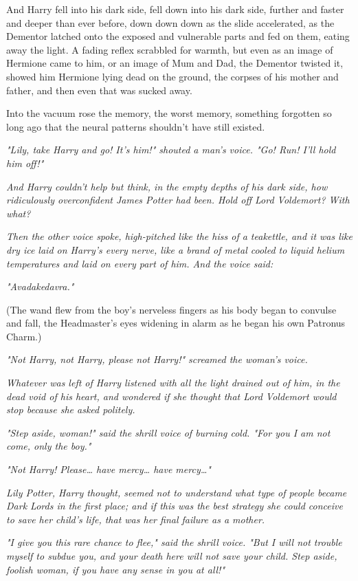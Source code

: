 And Harry fell into his dark side, fell down into his dark side, further and 
faster and deeper than ever before, down down down as the slide accelerated, as 
the Dementor latched onto the exposed and vulnerable parts and fed on them, 
eating away the light. A fading reflex scrabbled for warmth, but even as an 
image of Hermione came to him, or an image of Mum and Dad, the Dementor twisted 
it, showed him Hermione lying dead on the ground, the corpses of his mother and 
father, and then even that was sucked away.

Into the vacuum rose the memory, the worst memory, something forgotten so long 
ago that the neural patterns shouldn't have still existed.

\emph{"Lily, take Harry and go! It's him!" shouted a man's voice. "Go! Run! 
I'll hold him off!"}

\emph{And Harry couldn't help but think, in the empty depths of his dark side, 
how ridiculously overconfident James Potter had been. Hold off Lord Voldemort? 
With what?}

\emph{Then the other voice spoke, high-pitched like the hiss of a teakettle, 
and it was like dry ice laid on Harry's every nerve, like a brand of metal 
cooled to liquid helium temperatures and laid on every part of him. And the 
voice said:}

\emph{"Avadakedavra."}

(The wand flew from the boy's nerveless fingers as his body began to convulse 
and fall, the Headmaster's eyes widening in alarm as he began his own Patronus 
Charm.)

\emph{"Not Harry, not Harry, please not Harry!" screamed the woman's voice.}

\emph{Whatever was left of Harry listened with all the light drained out of 
him, in the dead void of his heart, and wondered if she thought that Lord 
Voldemort would stop because she asked politely.}

\emph{"Step aside, woman!" said the shrill voice of burning cold. "For you I am 
not come, only the boy."}

\emph{"Not Harry! Please{\ldots} have mercy{\ldots} have mercy{\ldots}"}

\emph{Lily Potter, Harry thought, seemed not to understand what type of people 
became Dark Lords in the first place; and if this was the best strategy she 
could conceive to save her child's life, that was her final failure as a 
mother.}

\emph{"I give you this rare chance to flee," said the shrill voice. "But I will 
not trouble myself to subdue you, and your death here will not save your child. 
Step aside, foolish woman, if you have any sense in you at all!"}

